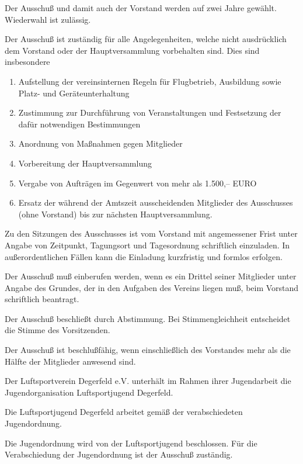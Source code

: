 \documentclass[11pt,a4paper,parskip=half]{scrartcl}
\begin{document}
\begin{contract}
\begin{multicols}{2}
    Der Ausschuß und damit auch der Vorstand werden auf zwei Jahre gewählt.
    Wiederwahl ist zulässig.

    Der Ausschuß ist zuständig für alle Angelegenheiten,
    welche nicht ausdrücklich dem Vorstand oder der Hauptversammlung vorbehalten sind.
    Dies sind insbesondere
    \begin{enumerate}[label=\alph*)]
      \item Aufstellung der vereinsinternen Regeln für Flugbetrieb,
      Ausbildung sowie Platz- und Geräteunterhaltung
      \item Zustimmung zur Durchführung von Veranstaltungen und Festsetzung der dafür notwendigen Bestimmungen
      \item Anordnung von Maßnahmen gegen Mitglieder
      \item Vorbereitung der Hauptversammlung
      \item Vergabe von Aufträgen im Gegenwert von mehr als 1.500,-- EURO
      \item Ersatz der während der Amtszeit ausscheidenden Mitglieder des Ausschusses (ohne Vorstand) bis zur nächsten Hauptversammlung.
    \end{enumerate}

    Zu den Sitzungen des Ausschusses ist vom Vorstand mit angemessener Frist unter Angabe von Zeitpunkt,
    Tagungsort und Tagesordnung schriftlich einzuladen.
    In außerordentlichen Fällen kann die Einladung kurzfristig und formlos erfolgen.

    Der Ausschuß muß einberufen werden,
    wenn es ein Drittel seiner Mitglieder unter Angabe des Grundes,
    der in den Aufgaben des Vereins liegen muß,
    beim Vorstand schriftlich beantragt.

    Der Ausschuß beschließt durch Abstimmung.
    Bei Stimmengleichheit entscheidet die Stimme des Vorsitzenden.

    Der Ausschuß ist beschlußfähig,
    wenn einschließlich des Vorstandes mehr als die Hälfte der Mitglieder anwesend sind.

    Der Luftsportverein Degerfeld e.V. unterhält im Rahmen ihrer Jugendarbeit die Jugendorganisation Luftsportjugend Degerfeld.

    Die Luftsportjugend Degerfeld arbeitet gemäß der verabschiedeten Jugendordnung.

    Die Jugendordnung wird von der Luftsportjugend beschlossen. Für die Verabschiedung der Jugendordnung ist der Ausschuß zuständig.


\end{multicols}
\end{contract}
\end{document}
